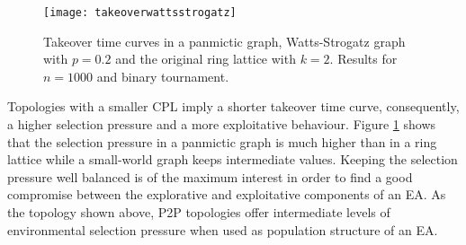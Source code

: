 \begin{figure}[htbp]
\begin{center}
\texttt{[image: takeoverwattsstrogatz]}
\end{center}
\vspace{-2ex}
\caption{Takeover time curves in a panmictic graph, Watts-Strogatz graph with $p=0.2$ and the original ring lattice with $k=2$. Results for $n=1000$ and binary tournament. }
\label{fig:takeoversw}
\end{figure}



Topologies with a smaller CPL imply a shorter takeover time curve, consequently, a higher selection pressure and a more exploitative behaviour. Figure \ref{fig:takeoversw} shows that the selection pressure in a panmictic graph is much higher than in a ring lattice while a small-world graph keeps intermediate values. Keeping the selection pressure well balanced is of the maximum interest in order to find a good compromise between the explorative and exploitative components of an EA. As the topology shown above, P2P topologies offer intermediate levels of environmental selection pressure when used as population structure of an EA.
